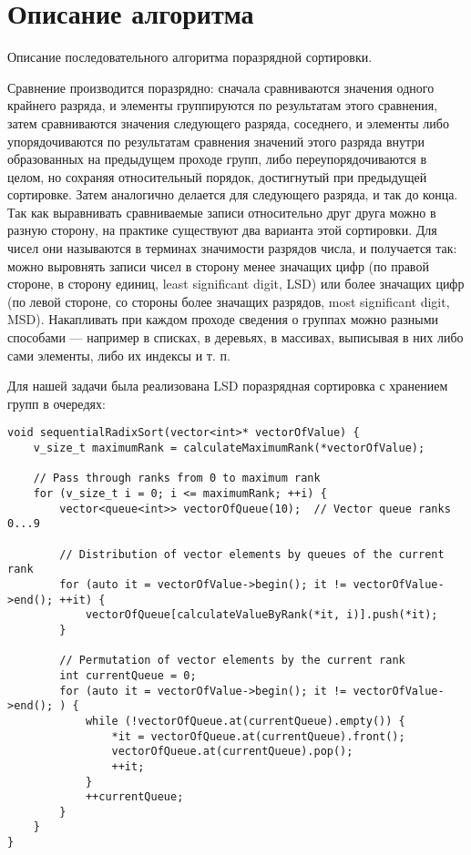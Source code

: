 \documentclass{report}
\begin{document}
\section*{Описание алгоритма}
Описание последовательного алгоритма поразрядной сортировки.

\par Сравнение производится поразрядно: сначала сравниваются значения одного крайнего разряда, и элементы группируются по результатам этого сравнения, затем сравниваются значения следующего разряда, соседнего, и элементы либо упорядочиваются по результатам сравнения значений этого разряда внутри образованных на предыдущем проходе групп, либо переупорядочиваются в целом, но сохраняя относительный порядок, достигнутый при предыдущей сортировке. Затем аналогично делается для следующего разряда, и так до конца.
Так как выравнивать сравниваемые записи относительно друг друга можно в разную сторону, на практике существуют два варианта этой сортировки. Для чисел они называются в терминах значимости разрядов числа, и получается так: можно выровнять записи чисел в сторону менее значащих цифр (по правой стороне, в сторону единиц, least significant digit, LSD) или более значащих цифр (по левой стороне, со стороны более значащих разрядов, most significant digit, MSD).
Накапливать при каждом проходе сведения о группах можно разными способами — например в списках, в деревьях, в массивах, выписывая в них либо сами элементы, либо их индексы и т. п.

\newpage

Для нашей задачи была реализована LSD поразрядная сортировка с хранением групп в очередях:

\begin{lstlisting}
void sequentialRadixSort(vector<int>* vectorOfValue) {
    v_size_t maximumRank = calculateMaximumRank(*vectorOfValue);

    // Pass through ranks from 0 to maximum rank
    for (v_size_t i = 0; i <= maximumRank; ++i) {
        vector<queue<int>> vectorOfQueue(10);  // Vector queue ranks 0...9

        // Distribution of vector elements by queues of the current rank
        for (auto it = vectorOfValue->begin(); it != vectorOfValue->end(); ++it) {
            vectorOfQueue[calculateValueByRank(*it, i)].push(*it);
        }

        // Permutation of vector elements by the current rank
        int currentQueue = 0;
        for (auto it = vectorOfValue->begin(); it != vectorOfValue->end(); ) {
            while (!vectorOfQueue.at(currentQueue).empty()) {
                *it = vectorOfQueue.at(currentQueue).front();
                vectorOfQueue.at(currentQueue).pop();
                ++it;
            }
            ++currentQueue;
        }
    }
}
\end{lstlisting}
\end{document}
